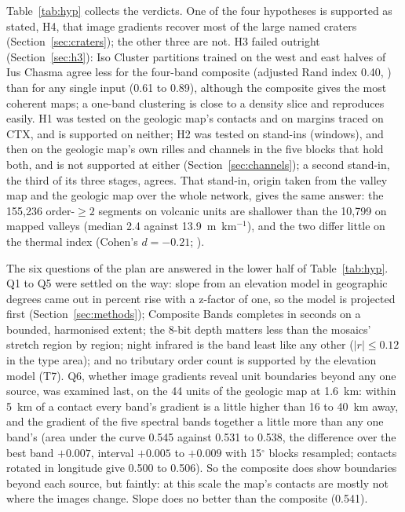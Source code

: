 \documentclass[twocolumn]{aastex701}
\begin{document}
Table~\ref{tab:hyp} collects the verdicts. One of the four hypotheses is supported as stated, H4, that image
gradients recover most of the large named craters (Section~\ref{sec:craters}); the other three are not. H3 failed outright (Section~\ref{sec:h3}): Iso
Cluster partitions trained on the west and east halves of Ius Chasma agree less for the four-band composite (adjusted
Rand index 0.40, \citealt{Hubert1985}) than for any single input (0.61 to 0.89), although the composite gives the most
coherent maps; a one-band clustering is close to a density slice and reproduces easily. H1 was tested on the geologic map's contacts and on margins traced on CTX, and is supported on neither; H2 was tested on stand-ins (windows),
and then on the geologic map's own rilles and channels in the five blocks that hold both, and is not supported at
either (Section~\ref{sec:channels}); a second stand-in, the third of its three stages, agrees. That stand-in,
origin taken from the valley map and the geologic map over the whole network, gives the same answer: the 155,236
order-$\ge2$ segments on volcanic units are shallower than the 10,799 on mapped valleys (median 2.4 against
13.9~m~km$^{-1}$), and the two differ little on the thermal index (Cohen's $d=-0.21$; \citealt{Cohen1988}). %

The six questions of the plan are answered in the lower half of Table~\ref{tab:hyp}. Q1 to Q5 were settled on the
way: slope from an elevation model in geographic degrees came out in percent rise with a z-factor of one, so the
model is projected first (Section~\ref{sec:methods}); Composite Bands completes in seconds on a bounded, harmonised extent;
the 8-bit depth matters less than the mosaics' stretch region by region; night infrared is the band least like any
other ($|r|\le0.12$ in the type area); and no tributary order count is supported by the elevation model (T7). Q6, whether
image gradients reveal unit boundaries beyond any one source, was examined last, on the 44 units of the geologic map
at 1.6~km: within 5~km of a contact every band's gradient is a little higher than 16 to 40~km away, and the gradient of
the five spectral bands together a little more than any one band's (area under the curve 0.545 against 0.531 to 0.538,
the difference over the best band $+0.007$, interval $+0.005$ to $+0.009$ with 15$^{\circ}$ blocks resampled; contacts
rotated in longitude give 0.500 to 0.506). So the composite does show boundaries beyond each source, but faintly: at this
scale the map's contacts are mostly not where the images change. Slope does no better than the composite (0.541). %
\end{document}
